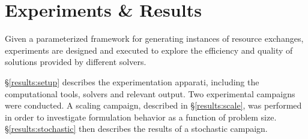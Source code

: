 \chapter{Experiments \& Results}\label{ch:results}

Given a parameterized framework for generating instances of resource exchanges,
experiments are designed and executed to explore the efficiency and quality of
solutions provided by different solvers. 

\S \ref{results:setup} describes the experimentation apparati, including the
computational tools, solvers and relevant output. Two experimental campaigns
were conducted. A scaling campaign, described in \S \ref{results:scale}, was
performed in order to investigate formulation behavior as a function of problem
size. \S \ref {results:stochastic} then describes the results of a stochastic
campaign.







